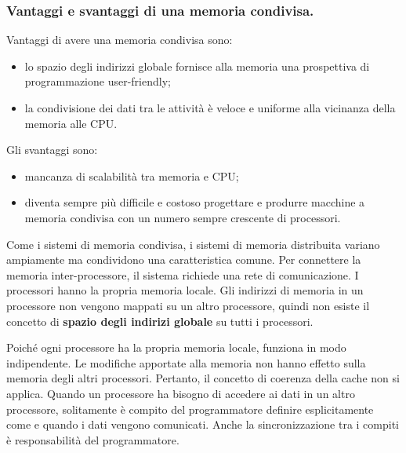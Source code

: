 	\subsubsection{Vantaggi e svantaggi di una memoria condivisa.} Vantaggi di avere una memoria condivisa sono:
	\begin{itemize}
		\item lo spazio degli indirizzi globale fornisce alla memoria una prospettiva di programmazione user-friendly; \item la condivisione dei dati tra le attività è veloce e uniforme alla vicinanza della memoria alle CPU.
	\end{itemize}
	Gli svantaggi sono:
	\begin{itemize}
		\item mancanza di scalabilità tra memoria e CPU; \item diventa sempre più difficile e costoso progettare e produrre macchine a memoria condivisa con un numero sempre crescente di processori.
	\end{itemize}

Come i sistemi di memoria condivisa, i sistemi di memoria distribuita variano ampiamente ma condividono una caratteristica comune. Per connettere la memoria inter-processore, il sistema richiede una rete di comunicazione.
I processori hanno la propria memoria locale. Gli indirizzi di memoria in un processore non vengono mappati su un altro processore, quindi non esiste il concetto di \textbf{spazio degli indirizi globale} su tutti i processori.

Poiché ogni processore ha la propria memoria locale, funziona in modo indipendente. Le modifiche apportate alla memoria non hanno effetto sulla memoria degli altri processori. Pertanto, il concetto di coerenza della cache non si applica.
Quando un processore ha bisogno di accedere ai dati in un altro processore, solitamente è compito del programmatore definire esplicitamente come e quando i dati vengono comunicati. Anche la sincronizzazione tra i compiti è responsabilità del programmatore.

